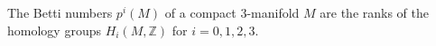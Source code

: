 The Betti numbers $p^i(M)$ of a compact 3-manifold $M$ are the ranks of the homology groups $H_i(M, \mathbb{Z})$ for $i = 0, 1, 2, 3$.
